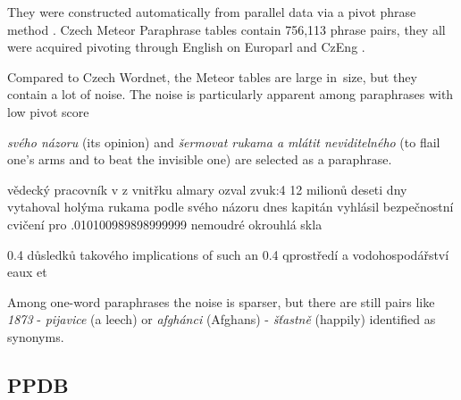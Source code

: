 They were constructed automatically from parallel data via a pivot phrase 
method \citep{pivoting}. Czech Meteor Paraphrase tables contain 756,113 phrase 
pairs, they all were acquired pivoting through English on Europarl and CzEng 
\citep{czeng}.

Compared to Czech Wordnet, the Meteor tables are large in~size, but they 
contain a lot of noise. The noise is particularly apparent among paraphrases 
with low pivot score

\textit{svého názoru}  (its opinion) and \textit{šermovat rukama a 
mlátit neviditelného} (to flail one's arms and to beat the invisible one) are 
selected as a paraphrase. 

vědecký pracovník v     z vnitřku almary ozval zvuk:4
12 milionů      deseti dny vytahoval holýma rukama
podle svého názoru      dnes kapitán vyhlásil bezpečnostní cvičení pro
.010100989898999999    nemoudré        okrouhlá skla

0.4    důsledků takového       implications of such an
0.4	 qprostředí a vodohospodářství    eaux et

Among one-word paraphrases the noise is sparser, but there are still pairs like 
\textit{1873} - \textit{pijavice} (a leech) or \textit{afgh\'{a}nci} (Afghans) - 
\textit{š\v{t}astně} (happily) identified as synonyms. 



\subsection{PPDB} 